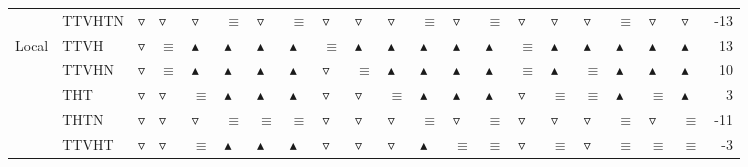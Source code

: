 \begin{table}
\begin{tabular}{llllllllllllllllllllr}
       & TTVHTN &  $\triangledown$ &   $\triangledown$ &   $\triangledown$ &          $\equiv$ &   $\triangledown$ &          $\equiv$ &   $\triangledown$ &   $\triangledown$ &   $\triangledown$ &          $\equiv$ &   $\triangledown$ &          $\equiv$ &   $\triangledown$ &   $\triangledown$ &   $\triangledown$ &          $\equiv$ &   $\triangledown$ &   $\triangledown$ &              -13 \\
Local & TTVH &  $\triangledown$ &          $\equiv$ &  $\blacktriangle$ &  $\blacktriangle$ &  $\blacktriangle$ &  $\blacktriangle$ &          $\equiv$ &  $\blacktriangle$ &  $\blacktriangle$ &  $\blacktriangle$ &  $\blacktriangle$ &  $\blacktriangle$ &          $\equiv$ &  $\blacktriangle$ &  $\blacktriangle$ &  $\blacktriangle$ &  $\blacktriangle$ &  $\blacktriangle$ &               13 \\
       & TTVHN &  $\triangledown$ &          $\equiv$ &  $\blacktriangle$ &  $\blacktriangle$ &  $\blacktriangle$ &  $\blacktriangle$ &   $\triangledown$ &          $\equiv$ &  $\blacktriangle$ &  $\blacktriangle$ &  $\blacktriangle$ &  $\blacktriangle$ &          $\equiv$ &  $\blacktriangle$ &          $\equiv$ &  $\blacktriangle$ &  $\blacktriangle$ &  $\blacktriangle$ &               10 \\
       & THT &  $\triangledown$ &   $\triangledown$ &          $\equiv$ &  $\blacktriangle$ &  $\blacktriangle$ &  $\blacktriangle$ &   $\triangledown$ &   $\triangledown$ &          $\equiv$ &  $\blacktriangle$ &  $\blacktriangle$ &  $\blacktriangle$ &   $\triangledown$ &          $\equiv$ &          $\equiv$ &  $\blacktriangle$ &          $\equiv$ &  $\blacktriangle$ &                3 \\
       & THTN &  $\triangledown$ &   $\triangledown$ &   $\triangledown$ &          $\equiv$ &          $\equiv$ &          $\equiv$ &   $\triangledown$ &   $\triangledown$ &   $\triangledown$ &          $\equiv$ &   $\triangledown$ &          $\equiv$ &   $\triangledown$ &   $\triangledown$ &   $\triangledown$ &          $\equiv$ &   $\triangledown$ &          $\equiv$ &              -11 \\
       & TTVHT &  $\triangledown$ &   $\triangledown$ &          $\equiv$ &  $\blacktriangle$ &  $\blacktriangle$ &  $\blacktriangle$ &   $\triangledown$ &   $\triangledown$ &   $\triangledown$ &  $\blacktriangle$ &          $\equiv$ &          $\equiv$ &   $\triangledown$ &          $\equiv$ &   $\triangledown$ &          $\equiv$ &          $\equiv$ &          $\equiv$ &               -3 \\

\end{tabular}
\end{table}
